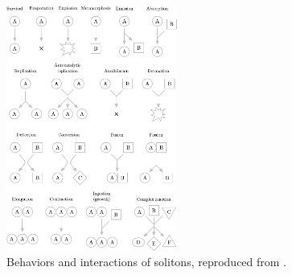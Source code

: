 \begin{figure}
\includegraphics[width=0.5\textwidth]{img/lenia-event-types}
\caption{Behaviors and interactions of solitons, reproduced from \citep{chan2020lenia}.}
\label{fig:lenia-event-types}
\end{figure}
